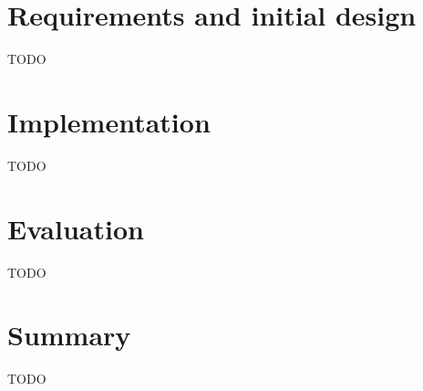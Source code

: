 \documentclass[english,11pt,twoside,a4paper]{article}
\begin{document}
\section{Requirements and initial design}

TODO

\section{Implementation}

TODO

\section{Evaluation}

TODO

\section{Summary}

TODO
\end{document}
